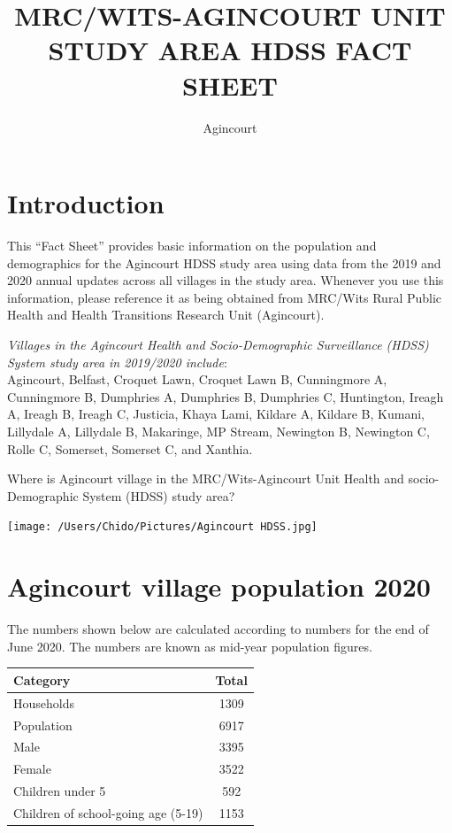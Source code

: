 \documentclass[15,a4paperpaper,]{article}
\title{MRC/WITS-AGINCOURT UNIT STUDY AREA HDSS FACT SHEET}
\author{Agincourt}
\date{}
\begin{document}
\renewcommand{\contentsname}{Sections}

\renewcommand{\pagename}{Seite}


\maketitle

\clearpage

\section{Introduction}

This ``Fact Sheet'' provides basic information on the population and
demographics for the Agincourt HDSS study area using data from the 2019
and 2020 annual updates across all villages in the study area. Whenever
you use this information, please reference it as being obtained from
MRC/Wits Rural Public Health and Health Transitions Research Unit
(Agincourt).

\emph{Villages in the Agincourt Health and Socio-Demographic
Surveillance (HDSS) System study area in 2019/2020 include}:\\
Agincourt, Belfast, Croquet Lawn, Croquet Lawn B, Cunningmore A,
Cunningmore B, Dumphries A, Dumphries B, Dumphries C, Huntington, Ireagh
A, Ireagh B, Ireagh C, Justicia, Khaya Lami, Kildare A, Kildare B,
Kumani, Lillydale A, Lillydale B, Makaringe, MP Stream, Newington B,
Newington C, Rolle C, Somerset, Somerset C, and Xanthia.

Where is Agincourt village in the MRC/Wits-Agincourt Unit Health and
socio-Demographic System (HDSS) study area?

\texttt{[image: /Users/Chido/Pictures/Agincourt HDSS.jpg]}

\section{Agincourt village population 2020}

The numbers shown below are calculated according to numbers for the end
of June 2020. The numbers are known as mid-year population figures.

\begin{table}[ht]
\centering
\begin{tabularx}{\textwidth}{|l|C|}
   \hline
Category & Total \\ 
  \hline
Households & 1309 \\ 
  Population & 6917 \\ 
  Male & 3395 \\ 
  Female & 3522 \\ 
  Children under 5 & 592 \\ 
  Children of school-going age (5-19) & 1153 \\ 
   \hline
\end{tabularx}
\end{table}
\end{document}
